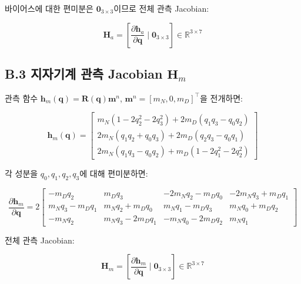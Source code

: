 바이어스에 대한 편미분은 $\mathbf{0}_{3\times 3}$이므로
전체 관측 Jacobian:
 
\begin{equation}
    \mathbf{H}_{a} = \left[\frac{\partial \mathbf{h}_a}{\partial \mathbf{q}} \;\Bigg|\; \mathbf{0}_{3\times 3}\right]
    \in \mathbb{R}^{3\times 7}
    \tag{B.12}
\end{equation}
 
\subsection*{B.3 지자기계 관측 Jacobian $\mathbf{H}_m$}
 
관측 함수 $\mathbf{h}_m(\mathbf{q}) = \mathbf{R}(\mathbf{q})\mathbf{m}^n$,
$\mathbf{m}^n = [m_N, 0, m_D]^\top$을 전개하면:
 
\begin{equation}
    \mathbf{h}_m(\mathbf{q}) =
    \begin{bmatrix}
        m_N(1 - 2q_2^2 - 2q_3^2) + 2m_D(q_1 q_3 - q_0 q_2) \\
        2m_N(q_1 q_2 + q_0 q_3) + 2m_D(q_2 q_3 - q_0 q_1) \\
        2m_N(q_1 q_3 - q_0 q_2) + m_D(1 - 2q_1^2 - 2q_2^2)
    \end{bmatrix}
    \tag{B.13}
\end{equation}
 
각 성분을 $q_0, q_1, q_2, q_3$에 대해 편미분하면:
 
\begin{equation}
    \frac{\partial \mathbf{h}_m}{\partial \mathbf{q}} = 2
    \begin{bmatrix}
        -m_D q_2 & m_D q_3 & -2m_N q_2 - m_D q_0 & -2m_N q_3 + m_D q_1 \\
         m_N q_3 - m_D q_1 & m_N q_2 + m_D q_0 & m_N q_1 - m_D q_3 & m_N q_0 + m_D q_2 \\
        -m_N q_2 & m_N q_3 - 2m_D q_1 & -m_N q_0 - 2m_D q_2 & m_N q_1
    \end{bmatrix}
    \tag{B.14}
\end{equation}
 
전체 관측 Jacobian:
 
\begin{equation}
    \mathbf{H}_{m} = \left[\frac{\partial \mathbf{h}_m}{\partial \mathbf{q}} \;\Bigg|\; \mathbf{0}_{3\times 3}\right]
    \in \mathbb{R}^{3\times 7}
    \tag{B.15}
\end{equation}
 
